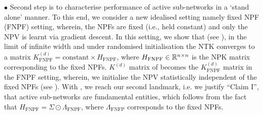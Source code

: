 $\bullet$  Second step is to characterise performance of active sub-networks in a `stand alone' manner. To this end, we consider a new idealised setting namely fixed NPF (FNPF) setting, wherein, the NPFs are fixed (i.e., held constant) and only the NPV is learnt via gradient descent. In this setting, we show that (see ), in the limit of infinite width and under randomised initialisation the NTK converges to a matrix $K^{(d)}_{\text{FNPF}}=\text{constant} \times H_{\text{FNPF}}$, where $H_{\text{FNPF}}\in\mathbb{R}^{n\times n}$ is the NPK matrix corresponding to the fixed NPFs. $K^{(d)}$ matrix of \cite{ntk,arora2019exact,cao2019generalization} becomes the $K^{(d)}_{\text{FNPF}}$ matrix in the FNPF setting,  wherein, we initialise the NPV statistically independent of the fixed NPFs (see ). With , we reach our second landmark, i.e. we justify ``Claim I'', that active sub-networks are fundamental entities, which follows from the fact that $H_{\text{FNPF}}=\Sigma\odot \Lambda_{\text{FNPF}}$, where $\Lambda_{\text{FNFP}}$ corresponds to the fixed NPFs.

